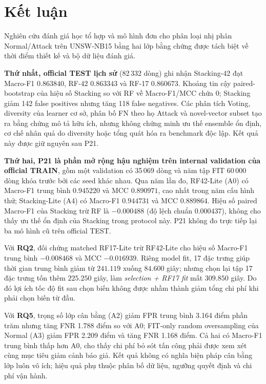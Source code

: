 \section{Kết luận}
\label{chap:ket-luan}
Nghiên cứu đánh giá học tổ hợp và mô hình đơn cho phân loại nhị phân Normal/Attack trên UNSW-NB15 bằng hai lớp bằng chứng được tách biệt về thời điểm thiết kế và bộ dữ liệu đánh giá.

\textbf{Thứ nhất, official TEST lịch sử} (82\,332 dòng) ghi nhận Stacking-42 đạt Macro-F1 $0.863840$, RF-42 $0.863343$ và RF-17 $0.860673$. Khoảng tin cậy paired-bootstrap của hiệu số Stacking so với RF về Macro-F1/MCC chứa 0; Stacking giảm 142 false positives nhưng tăng 118 false negatives. Các phân tích Voting, diversity của learner cơ sở, phân bố FN theo họ Attack và novel-vector subset tạo ra bằng chứng mô tả hữu ích, nhưng không chứng minh ưu thế ensemble ổn định, cơ chế nhân quả do diversity hoặc tổng quát hóa ra benchmark độc lập. Kết quả này được giữ nguyên sau P21.

\textbf{Thứ hai, P21 là phần mở rộng hậu nghiệm trên internal validation của official TRAIN}, gồm một validation có 35\,069 dòng và năm tập FIT 60\,000 dòng khóa trước bởi các seed khác nhau. Qua năm lần đo, RF42-Lite (A0) có Macro-F1 trung bình $0.945220$ và MCC $0.890971$, cao nhất trong năm cấu hình thử; Stacking-Lite (A4) có Macro-F1 $0.944731$ và MCC $0.889864$. Hiệu số paired Macro-F1 của Stacking trừ RF là $-0.000488$ (độ lệch chuẩn $0.000437$), không cho thấy ưu thế ổn định của Stacking trong protocol này. P21 không đo trực tiếp lại ba mô hình cũ trên official TEST.

Với \textbf{RQ2}, đối chứng matched RF17-Lite trừ RF42-Lite cho hiệu số Macro-F1 trung bình $-0.008468$ và MCC $-0.016939$. Riêng model fit, 17 đặc trưng giúp thời gian trung bình giảm từ $241.119$ xuống $84.600$ giây; nhưng chọn lại tập 17 đặc trưng tốn thêm $225.250$ giây, làm \emph{selection + RF17 fit} mất $309.850$ giây. Do đó lợi ích tốc độ fit sau chọn biến không được nhầm thành giảm tổng chi phí khi phải chọn biến từ đầu.

Với \textbf{RQ5}, trọng số lớp cân bằng (A2) giảm FPR trung bình 3.164 điểm phần trăm nhưng tăng FNR 1.788 điểm so với A0; FIT-only random oversampling của Normal (A3) giảm FPR 2.209 điểm và tăng FNR 1.168 điểm. Cả hai có Macro-F1 trung bình thấp hơn A0, cho thấy chi phí bỏ sót tấn công phải được xem xét cùng mục tiêu giảm cảnh báo giả. Kết quả không có nghĩa biện pháp cân bằng lớp luôn vô ích; hiệu quả phụ thuộc phân bố dữ liệu, ngưỡng quyết định và chi phí vận hành.

